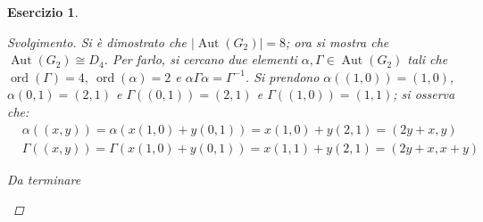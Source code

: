 \documentclass[11pt]{scrartcl}
\theoremstyle{style1}
\newtheorem{esercizio}{Esercizio}[section]
\newenvironment{svolgimento}{\renewcommand\qedsymbol{$\blacksquare$}\begin{proof}[Svolgimento]}{\end{proof}}
\numberwithin{equation}{subsection}
\begin{document}
\begin{esercizio}
\begin{svolgimento}
	Si \`e dimostrato che $|\operatorname{Aut} (G_2)| = 8$; ora si mostra che $\operatorname{Aut} (G_2) \cong D_4$.
	Per farlo, si cercano due elementi $\alpha , \Gamma \in \operatorname{Aut} (G_2)$ tali che $\operatorname{ord}(\Gamma) = 4, \ \operatorname{ord}(\alpha ) = 2$ e $\alpha \Gamma \alpha = \Gamma^{-1}$.
	Si prendono $\alpha ((1,0))= (1,0)$, $\alpha (0,1) = (2,1)$ e $\Gamma((0,1)) = (2,1)$ e $\Gamma((1,0)) = (1,1)$; si osserva che:
	\[
	\begin{split}
		&\alpha ((x,y)) = \alpha (x(1,0)+y(0,1)) = x(1,0) + y (2,1) =(2y+x,y)\\
		& \Gamma((x,y)) = \Gamma (x(1,0) + y (0,1)) = x (1,1) + y(2,1) = (2y+x,x+y)
	\end{split}
	\] 
	\begin{center}
		Da terminare
	\end{center}
\end{svolgimento}
\end{esercizio}
\end{document}
